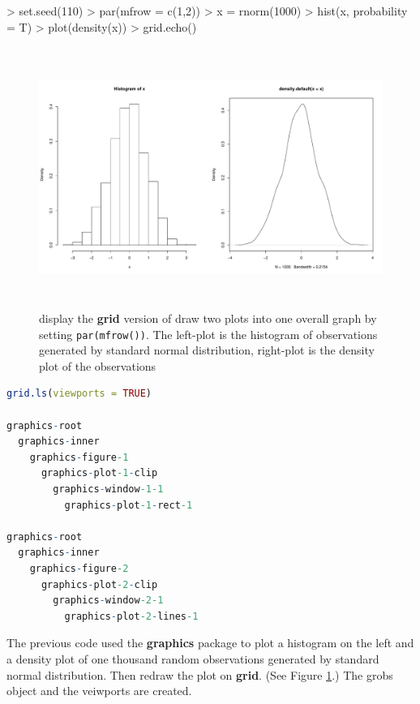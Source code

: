 \documentclass{report}
\begin{document}
\begin{Schunk}
\begin{Sinput}
> set.seed(110)
> par(mfrow = c(1,2))
> x = rnorm(1000)
> hist(x, probability = T)
> plot(density(x))
> grid.echo()
\end{Sinput}
\end{Schunk}
\begin{figure}[h]
	\begin{center}
		\includegraphics[height = 8.5cm, width = 15cm]{figure/viewport_demo_1.pdf}
		\caption{display the \textbf{grid} version of draw two plots into one overall graph by setting \texttt{par(mfrow())}. The left-plot is the histogram of observations generated by standard normal distribution, right-plot is the density plot of the observations}
		\label{figure_4.1}
	\end{center}
\end{figure}

\begin{lstlisting}[language = R]
grid.ls(viewports = TRUE)

graphics-root
  graphics-inner
    graphics-figure-1
      graphics-plot-1-clip
        graphics-window-1-1
          graphics-plot-1-rect-1

graphics-root
  graphics-inner
    graphics-figure-2
      graphics-plot-2-clip
        graphics-window-2-1
          graphics-plot-2-lines-1


\end{lstlisting}
The previous code used the \textbf{graphics} package to plot a histogram on the left and a density plot of one thousand random observations generated by standard normal distribution. Then redraw the plot on \textbf{grid}. (See Figure \ref{figure_4.1}.) The grobs object and the veiwports are created. \\
\end{document}
